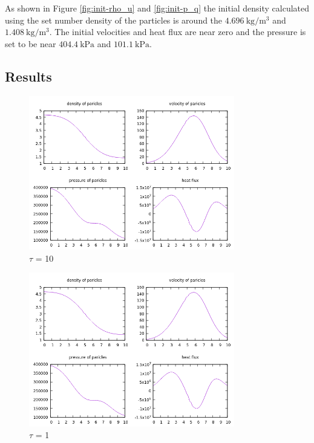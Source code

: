 \documentclass[paper=a4, fontsize=12pt]{scrartcl}
\begin{document}
\noindent
As shown in Figure \ref{fig:init-rho_u} and \ref{fig:init-p_q} the initial density calculated using the
set number density of the particles is around the $\SI{4.696}{\kilogram \per \meter^3}$
and $\SI{1.408}{\kilogram \per \meter^3}$.
The initial velocities and heat flux are near zero and the pressure is set to be near
$\SI{404.4}{\kilo \pascal}$ and $\SI{101.1}{\kilo \pascal}$.

\subsection*{Results}
\begin{figure}[H]
        \centering
        \includegraphics[width=0.8\textwidth]{tau10}
        \caption{$\tau$ = 10}
        \label{fig:tau10}
\end{figure}
\begin{figure}[H]
        \centering
        \includegraphics[width=0.8\textwidth]{tau1}
        \caption{$\tau$ = 1}
        \label{fig:tau1}
\end{figure}
\end{document}

